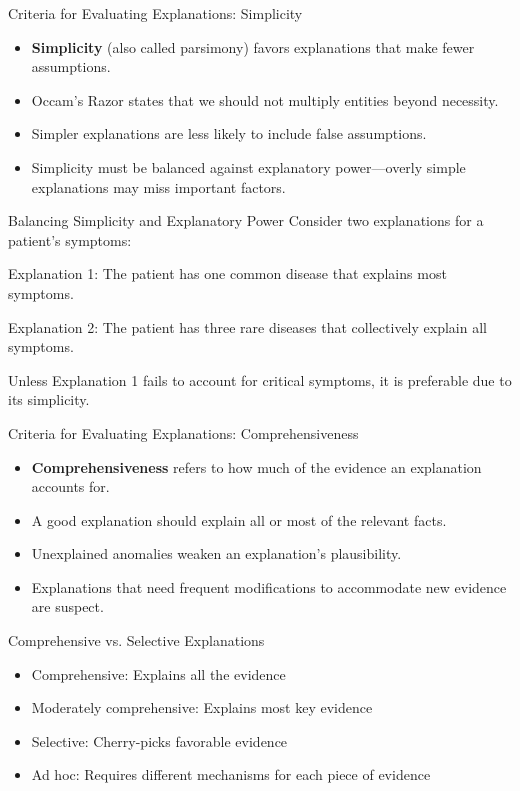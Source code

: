 \documentclass{beamer}
\begin{document}
\begin{frame}{Criteria for Evaluating Explanations: Simplicity}
    \begin{itemize}
        \item \textbf{Simplicity} (also called parsimony) favors explanations that make fewer assumptions.
        \item Occam's Razor states that we should not multiply entities beyond necessity.
        \item Simpler explanations are less likely to include false assumptions.
        \item Simplicity must be balanced against explanatory power—overly simple explanations may miss important factors.
    \end{itemize}
    
    \begin{exampleblock}{Balancing Simplicity and Explanatory Power}
        Consider two explanations for a patient's symptoms:
        
        Explanation 1: The patient has one common disease that explains most symptoms.
        
        Explanation 2: The patient has three rare diseases that collectively explain all symptoms.
        
        Unless Explanation 1 fails to account for critical symptoms, it is preferable due to its simplicity.
    \end{exampleblock}
\end{frame}

\begin{frame}{Criteria for Evaluating Explanations: Comprehensiveness}
    \begin{itemize}
        \item \textbf{Comprehensiveness} refers to how much of the evidence an explanation accounts for.
        \item A good explanation should explain all or most of the relevant facts.
        \item Unexplained anomalies weaken an explanation's plausibility.
        \item Explanations that need frequent modifications to accommodate new evidence are suspect.
    \end{itemize}
    
    \begin{block}{Comprehensive vs. Selective Explanations}
        \begin{itemize}
            \item Comprehensive: Explains all the evidence
            \item Moderately comprehensive: Explains most key evidence
            \item Selective: Cherry-picks favorable evidence
            \item Ad hoc: Requires different mechanisms for each piece of evidence
        \end{itemize}
    \end{block}
\end{frame}
\end{document}
